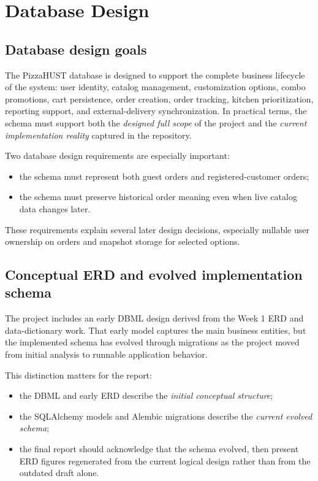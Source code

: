 \section{Database Design}

\subsection{Database design goals}

The PizzaHUST database is designed to support the complete business lifecycle of the system: user identity, catalog management, customization options, combo promotions, cart persistence, order creation, order tracking, kitchen prioritization, reporting support, and external-delivery synchronization. In practical terms, the schema must support both the \emph{designed full scope} of the project and the \emph{current implementation reality} captured in the repository.

Two database design requirements are especially important:

\begin{itemize}
    \item the schema must represent both guest orders and registered-customer orders;
    \item the schema must preserve historical order meaning even when live catalog data changes later.
\end{itemize}

These requirements explain several later design decisions, especially nullable user ownership on orders and snapshot storage for selected options.

\subsection{Conceptual ERD and evolved implementation schema}

The project includes an early DBML design derived from the Week 1 ERD and data-dictionary work. That early model captures the main business entities, but the implemented schema has evolved through migrations as the project moved from initial analysis to runnable application behavior.

This distinction matters for the report:

\begin{itemize}
    \item the DBML and early ERD describe the \emph{initial conceptual structure};
    \item the SQLAlchemy models and Alembic migrations describe the \emph{current evolved schema};
    \item the final report should acknowledge that the schema evolved, then present ERD figures regenerated from the current logical design rather than from the outdated draft alone.
\end{itemize}

